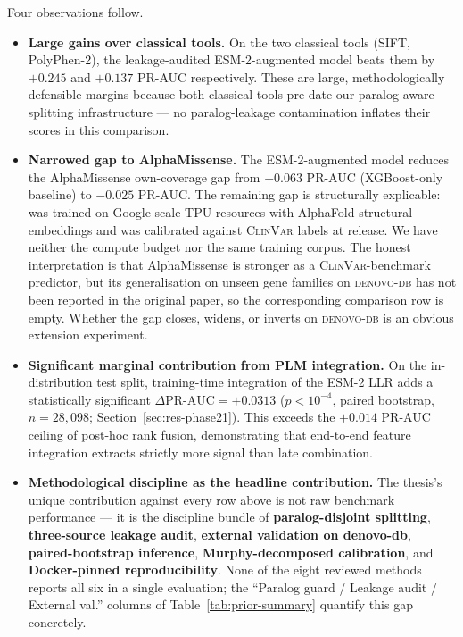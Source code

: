 \documentclass[11pt,a4paper,oneside]{report}
\begin{document}
Four observations follow.

\begin{itemize}[leftmargin=1.6em, itemsep=0.4em]
\item \textbf{Large gains over classical tools.} On the two
classical tools (SIFT, PolyPhen-2), the leakage-audited
ESM-2-augmented model beats them by $+0.245$ and $+0.137$
PR-AUC respectively. These are large, methodologically defensible
margins because both classical tools pre-date our paralog-aware
splitting infrastructure --- no paralog-leakage contamination
inflates their scores in this comparison.

\item \textbf{Narrowed gap to AlphaMissense.} The ESM-2-augmented
model reduces the AlphaMissense own-coverage gap from $-0.063$
PR-AUC (XGBoost-only baseline) to $-0.025$ PR-AUC.
The remaining gap is structurally explicable:
\citet{cheng2023alphamissense} was trained on Google-scale TPU
resources with AlphaFold structural embeddings and was calibrated
against \textsc{ClinVar} labels at release. We have neither the
compute budget nor the same training corpus. The honest
interpretation is that AlphaMissense is stronger as a
\textsc{ClinVar}-benchmark predictor, but its generalisation on
unseen gene families on \textsc{denovo-db} has not been reported
in the original paper, so the corresponding comparison row is
empty. Whether the gap closes, widens, or inverts on
\textsc{denovo-db} is an obvious extension experiment.

\item \textbf{Significant marginal contribution from PLM integration.}
On the in-distribution test split, training-time integration of
the ESM-2 LLR adds a statistically significant $\Delta\text{PR-AUC}
=+0.0313$ ($p<10^{-4}$, paired bootstrap, $n=28{,}098$;
Section~\ref{sec:res-phase21}). This exceeds the $+0.014$
PR-AUC ceiling of post-hoc rank fusion, demonstrating that
end-to-end feature integration extracts strictly more signal
than late combination.

\item \textbf{Methodological discipline as the headline contribution.}
The thesis's unique contribution against every row above is not
raw benchmark performance --- it is the discipline bundle of
\textbf{paralog-disjoint splitting}, \textbf{three-source
leakage audit}, \textbf{external validation on denovo-db},
\textbf{paired-bootstrap inference}, \textbf{Murphy-decomposed
calibration}, and \textbf{Docker-pinned reproducibility}. None
of the eight reviewed methods reports all six in a single
evaluation; the ``Paralog guard / Leakage audit / External val.''
columns of Table~\ref{tab:prior-summary} quantify this gap
concretely.
\end{itemize}
\end{document}
